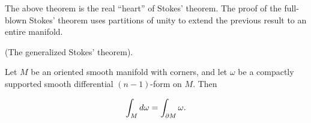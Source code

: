 \begin{remark}
    The above theorem is the real ``heart'' of Stokes' theorem. The proof of the full-blown Stokes' theorem uses partitions of unity to extend the previous result to an entire manifold.
\end{remark}

\begin{theorem}
     (The generalized Stokes' theorem).
    
    Let $M$ be an oriented smooth manifold with corners, and let $\omega$ be a compactly supported smooth differential $(n - 1)$-form on $M$. Then 
    
    \begin{align*}
        \int_M d \omega = \int_{\partial M} \omega.
    \end{align*}
\end{theorem}

